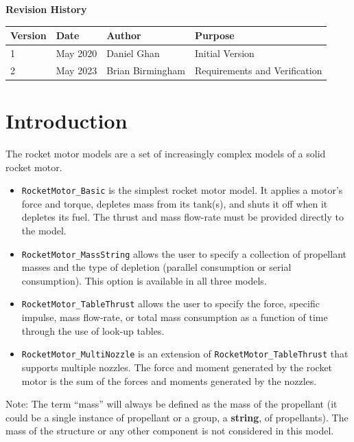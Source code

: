 \documentclass[11pt,fleqn]{report}
\begin{document}
\titlePage
\thispagestyle{empty}
\tableofcontents %
\vfill
{\Large \textbf {Revision History}}
{\large
\begin{center}
\begin{tabular}{|l||l|l|l|}
\hline
 \textbf{Version} & \textbf{Date} & \textbf{Author} & \textbf{Purpose} \\ \hline \hline
1 & May 2020 & Daniel Ghan & Initial Version \\ \hline
2 & May 2023 & Brian Birmingham & Requirements and Verification \\ \hline
\end{tabular}
\end{center}
}

\chapter{Introduction} %
\par The rocket motor models are a set of increasingly complex models of a solid rocket motor. \begin{itemize}
\item \verb|RocketMotor_Basic| is the simplest rocket motor model.  It applies a motor's force and torque, depletes mass from its tank(s), and shuts it off when it depletes its fuel. The thrust and mass flow-rate must be provided directly to the model.
\item \verb|RocketMotor_MassString| allows the user to specify a collection of propellant masses and the type of depletion (parallel consumption or serial consumption).  This option is available in all three models.  
\item \verb|RocketMotor_TableThrust| allows the user to specify the force, specific impulse, mass flow-rate, or total mass consumption as a function of time through the use of look-up tables.
\item \verb|RocketMotor_MultiNozzle| is an extension of \verb|RocketMotor_TableThrust| that supports multiple nozzles. The force and moment generated by the rocket motor is the sum of the forces and moments generated by the nozzles.
\end{itemize}
Note:  The term ``mass'' will always be defined as the mass of the propellant (it could be a single instance of propellant or a group, a \textbf{string}, of propellants).  The mass of the structure or any other component is not considered in this model.
\end{document}
